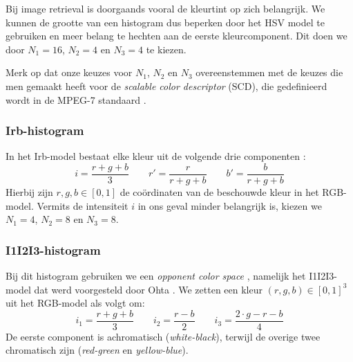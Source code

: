 Bij image retrieval is doorgaands vooral de kleurtint op zich belangrijk. We kunnen de grootte van
een histogram dus beperken door het HSV model te gebruiken en meer belang te hechten aan de
eerste kleurcomponent. Dit doen we door $N_1=16$, $N_2=4$ en $N_3=4$ te kiezen.

Merk op dat onze keuzes voor $N_1$, $N_2$ en $N_3$ overeenstemmen met de keuzes die men gemaakt
heeft voor de \emph{scalable color descriptor} (SCD), die gedefinieerd wordt in de MPEG-7
standaard \cite{manjunath:color_and_texture_descriptors}.

\subsubsection{Irb-histogram}

In het Irb-model bestaat elke kleur uit de volgende drie componenten \cite{ohta:color_info_for_region_segm}:
$$
i = \frac{r+g+b}{3} \qquad
r' = \frac{r}{r+g+b} \qquad
b' = \frac{b}{r+g+b}
$$
Hierbij zijn $r,g,b \in [0,1]$ de co\"ordinaten van de beschouwde kleur in het RGB-model.
Vermits de intensiteit $i$ in ons geval minder belangrijk is, kiezen we $N_1=4$, $N_2=8$ en $N_3=8$.

%

\subsubsection{I1I2I3-histogram}

Bij dit histogram gebruiken we een
\emph{opponent color space} \cite{tkalcic:colour_spaces, sharma:digital_color_imaging}, namelijk het I1I2I3-model dat werd voorgesteld door 
Ohta \cite{ohta:color_info_for_region_segm}. We zetten een kleur $(r,g,b) \in [0,1]^3$ uit het RGB-model als volgt om:
$$
i_1 = \frac{r+g+b}{3} \qquad
i_2 = \frac{r-b}{2} \qquad
i_3 = \frac{2 \cdot g - r - b}{4}
$$
De eerste component is achromatisch (\emph{white-black}), terwijl de overige twee 
chromatisch zijn (\emph{red-green} en \emph{yellow-blue}).

